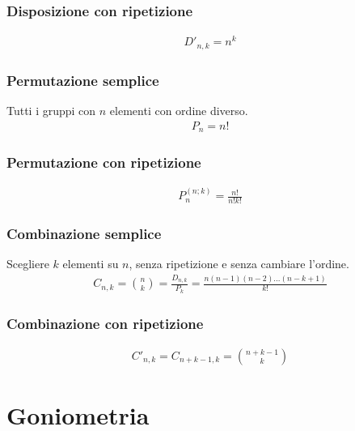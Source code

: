 \documentclass[a4paper]{article}
\begin{document}
	\subsubsection*{Disposizione con ripetizione}
	\begin{align*}
		D'_{n,k} = n^k
	\end{align*}

	\subsubsection*{Permutazione semplice}
	Tutti i gruppi con $n$ elementi con ordine diverso.
	\begin{align*}
		P_n = n! 
	\end{align*}
	
	\subsubsection*{Permutazione con ripetizione}
	\begin{align*}
		P_n^{(n;k)}=\frac{n!}{n!k!}
	\end{align*}
	
	\subsubsection*{Combinazione semplice}
	Scegliere $k$ elementi su $n$, senza ripetizione e senza cambiare l'ordine.
	\begin{align*}
		C_{n,k} = {{n}\choose{k}} = \frac{D_{n,k}}{P_k} = \frac{n(n-1)(n-2)...(n-k+1)}{k!} 
	\end{align*}
	
	\subsubsection*{Combinazione con ripetizione}
	\begin{align*}
		C'_{n,k} = C_{n+k-1 , k} = {{n+k-1}\choose{k}}
	\end{align*}
	
	\newpage
	\section{Goniometria}
		
\end{document}
